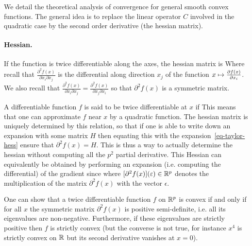 We detail the theoretical analysis of convergence for general smooth convex functions. 
%
The general idea is to replace the linear operator $C$ involved in the quadratic case by the second order derivative (the hessian matrix).  

\paragraph{Hessian.}

If the function is twice differentiable along the axes, the hessian matrix is 
Where recall that $\frac{\partial^2 f(x)}{\partial x_i \partial x_j}$ is the differential along direction $x_j$ of the function $x \mapsto \frac{ \partial f(x)}{\partial x_i}$. We also recall that $\frac{\partial^2 f(x)}{\partial x_i \partial x_j} = \frac{\partial^2 f(x)}{\partial x_j \partial x_i}$ so that $\partial^2 f(x)$ is a symmetric matrix.

A differentiable function $f$ is said to be twice differentiable at $x$ if
This means that one can approximate $f$ near $x$ by a quadratic function. 
%
The hessian matrix is uniquely determined by this relation, so that if one is able to write down an expansion with some matrix $H$
then equating this with the expansion~\eqref{eq-taylor-hess} ensure that $\partial^2 f(x)=H$. This is thus a way to actually determine the hessian without computing all the $p^2$ partial derivative.
%
This Hessian can equivalently be obtained by performing an expansion (i.e. computing the differential) of the gradient since
where $[\partial^2 f(x)](\varepsilon) \in \mathbb{R}^p$ denotes the multiplication of the matrix $\partial^2 f(x)$ with the vector $\epsilon$. 

One can show that a twice differentiable function $f$ on $\mathbb{R}^p$ is convex if and only if for all $x$ the symmetric matrix $\partial^2 f(x)$ is positive semi-definite, i.e. all its eigenvalues are non-negative. 
% 
Furthermore, if these eigenvalues are strictly positive then $f$ is strictly convex (but the converse is not true, for instance $x^4$ is strictly convex on $\mathbb{R}$ but its second derivative vanishes at $x=0$). 

